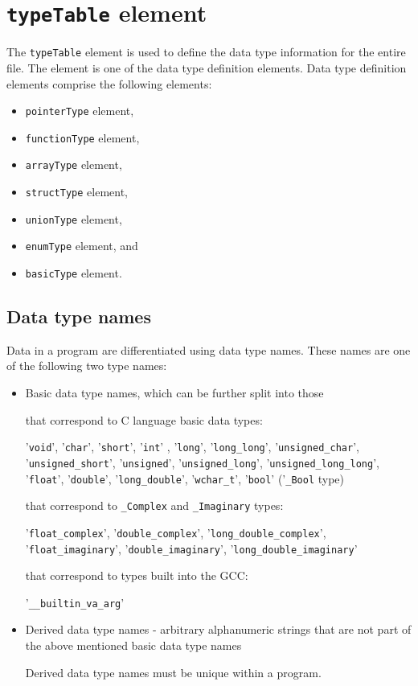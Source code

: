 \section{ {\tt typeTable} element}

The {\tt typeTable} element is used to define the data type information for the entire file. The element is one of the data type definition elements. Data type definition elements comprise the following elements:

\begin{itemize}
\item {\tt pointerType} element,
\item {\tt functionType} element,
\item {\tt arrayType} element,
\item {\tt structType} element,
\item {\tt unionType} element, 
\item {\tt enumType} element, and
\item {\tt basicType} element.
\end{itemize}


\subsection{Data type names}

Data in a program are differentiated using data type names. These names are one of the following two type names:

\begin{itemize}
\item Basic data type names, which can be further split into those

that correspond to C language basic data types:

'{\tt void}', '{\tt char}', '{\tt short}', '{\tt int}' , '{\tt long}', '{\tt long\_long}', '{\tt unsigned\_char}', '{\tt unsigned\_short}', '{\tt unsigned}', '{\tt unsigned\_long}', '{\tt unsigned\_long\_long}', '{\tt float}', '{\tt double}', '{\tt long\_double}', '{\tt wchar\_t}', '{\tt bool}' ('{\tt \_Bool} type)

that correspond to {\tt \_Complex} and {\tt \_Imaginary} types:

'{\tt float\_complex}', '{\tt double\_complex}', '{\tt long\_double\_complex}', '{\tt float\_imaginary}', '{\tt double\_imaginary}', '{\tt long\_double\_imaginary}'

that correspond to types built into the GCC:

'{\tt \_\_builtin\_va\_arg}'

\item Derived data type names - arbitrary alphanumeric strings that are not part of the above mentioned basic data type names

Derived data type names must be unique within a program.
\end{itemize}


